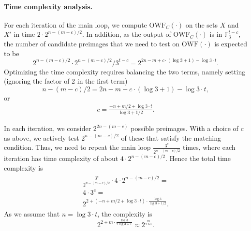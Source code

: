 \documentclass[orivec,envcountsect]{llncs}
\newcommand{\OWF}{\text{OWF}}
\begin{document}
\paragraph{Time complexity analysis.}
For each iteration of the main loop, we compute $\OWF_C(\cdot)$ on the sets $X$ and $X'$ in time $2 \cdot 2^{n - (m -c)/2}$. In addition, as the output of $\OWF_C(\cdot)$ is in $\mathbb{F}_3^{t-c}$,
the number of candidate preimages that we need to test on $\OWF(\cdot)$ is expected to be
$$2^{n - (m -c)/2} \cdot 2^{n - (m -c)/2} / 3^{t-c} = 2^{2n - m + c \cdot (\log 3 + 1) - \log 3 \cdot t}.$$
Optimizing the time complexity requires balancing the two terms, namely setting (ignoring the factor of 2 in the first term)
$$n - (m -c)/2 = 2n - m + c \cdot (\log 3 + 1) - \log 3 \cdot t,$$ or
\begin{align}
\label{eq:c}
c = \tfrac{-n + m/2 + \log 3 \cdot t}{\log 3 + 1/2}.
\end{align}

In each iteration, we consider $2^{2n - (m -c)}$ possible preimages. With a choice of $c$ as above,
we actively test $2^{n - (m -c)/2}$ of these that satisfy the matching condition. Thus, we need to repeat the main loop $\tfrac{3^{c}}{ 2^{n - (m -c)/2}}$ times, where each iteration has time complexity of about $4 \cdot 2^{n - (m -c)/2}$. Hence the total time complexity is
\begin{align}
\label{eq:best}
\begin{split}
\tfrac{3^{c}}{ 2^{n - (m -c)/2}} \cdot 4 \cdot 2^{n - (m -c)/2} = \\
4 \cdot 3^{c} = \\
2^{2 + (-n + m/2 + \log 3 \cdot t) \cdot \tfrac{\log 3}{\log 3 + 1/2}}.
\end{split}
\end{align}
As we assume that $n = \log 3 \cdot t$, the complexity is
$$2^{2 + m \cdot \tfrac{\log 3}{2 \log 3 + 1}} \approx 2^{\tfrac{m}{2.63}}.$$
\end{document}
